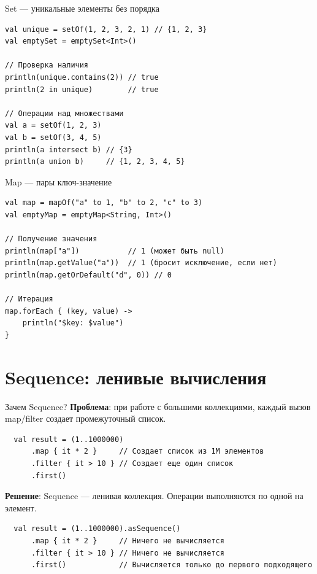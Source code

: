 \documentclass[aspectratio=169]{beamer}
\begin{document}
\begin{frame}[fragile]{Set — уникальные элементы без порядка}
\lstset{language=Kotlin}
\begin{lstlisting}
val unique = setOf(1, 2, 3, 2, 1) // {1, 2, 3}
val emptySet = emptySet<Int>()

// Проверка наличия
println(unique.contains(2)) // true
println(2 in unique)        // true

// Операции над множествами
val a = setOf(1, 2, 3)
val b = setOf(3, 4, 5)
println(a intersect b) // {3}
println(a union b)     // {1, 2, 3, 4, 5}
\end{lstlisting}
\end{frame}

\begin{frame}[fragile]{Map — пары ключ-значение}
\lstset{language=Kotlin}
\begin{lstlisting}
val map = mapOf("a" to 1, "b" to 2, "c" to 3)
val emptyMap = emptyMap<String, Int>()

// Получение значения
println(map["a"])           // 1 (может быть null)
println(map.getValue("a"))  // 1 (бросит исключение, если нет)
println(map.getOrDefault("d", 0)) // 0

// Итерация
map.forEach { (key, value) ->
    println("$key: $value")
}
\end{lstlisting}
\end{frame}

\section{Sequence: ленивые вычисления}

\begin{frame}[fragile]{Зачем Sequence?}
  \textbf{Проблема}: при работе с большими коллекциями, каждый вызов map/filter создает промежуточный список.
  \begin{lstlisting}
  val result = (1..1000000)
      .map { it * 2 }     // Создает список из 1M элементов
      .filter { it > 10 } // Создает еще один список
      .first()
  \end{lstlisting}

  \textbf{Решение}: Sequence — ленивая коллекция. Операции выполняются по одной на элемент.
  \begin{lstlisting}
  val result = (1..1000000).asSequence()
      .map { it * 2 }     // Ничего не вычисляется
      .filter { it > 10 } // Ничего не вычисляется
      .first()            // Вычисляется только до первого подходящего
  \end{lstlisting}
\end{frame}
\end{document}
